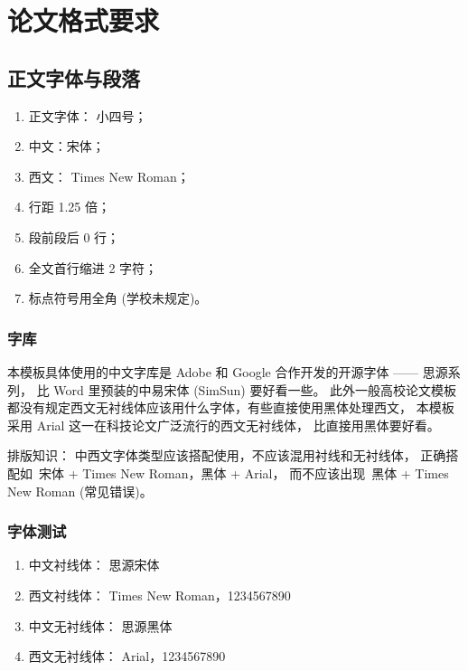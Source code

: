 \chapter{论文格式要求}

\section{正文字体与段落}

\begin{enumerate}
	\item 正文字体： 小四号；
	\item 中文：宋体；
	\item 西文： Times New Roman；
	\item 行距 1.25 倍；
	\item 段前段后 0 行；
	\item 全文首行缩进 2 字符；
	\item 标点符号用全角 (学校未规定)。
\end{enumerate}

\subsection{字库}

本模板具体使用的中文字库是 Adobe 和 Google 合作开发的开源字体 —— 思源系列，
比 Word 里预装的中易宋体 (SimSun) 要好看一些。
此外一般高校论文模板都没有规定西文无衬线体应该用什么字体，有些直接使用黑体处理西文，
本模板采用 Arial 这一在科技论文广泛流行的西文无衬线体，
比直接用黑体要好看。

\textsf{排版知识：} 中西文字体类型应该搭配使用，不应该混用衬线和无衬线体，
正确搭配如~宋体 + Times New Roman，黑体 + Arial，
而不应该出现~黑体 + Times New Roman (常见错误)。

\subsection{字体测试}

\begin{enumerate}
	\item 中文衬线体： 思源宋体
	\item 西文衬线体： Times New Roman，1234567890
	\item 中文无衬线体： \textsf{思源黑体}
	\item 西文无衬线体： \textsf{Arial，1234567890}
\end{enumerate}

